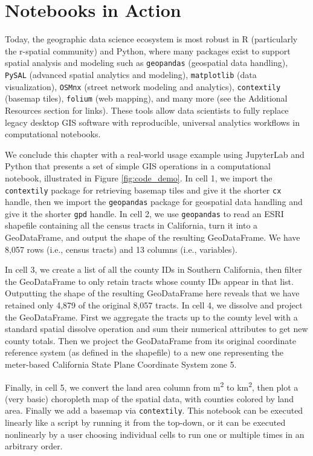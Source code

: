 \documentclass[11pt,letterpaper]{article}
\begin{document}
\section{Notebooks in Action}

Today, the geographic data science ecosystem is most robust in R (particularly the r-spatial community) and Python, where many packages exist to support spatial analysis and modeling such as \texttt{geopandas} (geospatial data handling), \texttt{PySAL} (advanced spatial analytics and modeling), \texttt{matplotlib} (data visualization), \texttt{OSMnx}  (street network modeling and analytics), \texttt{contextily} (basemap tiles), \texttt{folium} (web mapping), and many more (see the Additional Resources section for links). These tools allow data scientists to fully replace legacy desktop GIS software with reproducible, universal analytics workflows in computational notebooks.

We conclude this chapter with a real-world usage example using JupyterLab and Python that presents a set of simple GIS operations in a computational notebook, illustrated in Figure \ref{fig:code_demo}. In cell 1, we import the \texttt{contextily} package for retrieving basemap tiles and give it the shorter \texttt{cx} handle, then we import the \texttt{geopandas} package for geospatial data handling and give it the shorter \texttt{gpd} handle. In cell 2, we use \texttt{geopandas} to read an ESRI shapefile containing all the census tracts in California, turn it into a GeoDataFrame, and output the shape of the resulting GeoDataFrame. We have 8,057 rows (i.e., census tracts) and 13 columns (i.e., variables).

In cell 3, we create a list of all the county IDs in Southern California, then filter the GeoDataFrame to only retain tracts whose county IDs appear in that list. Outputting the shape of the resulting GeoDataFrame here reveals that we have retained only 4,879 of the original 8,057 tracts. In cell 4, we dissolve and project the GeoDataFrame. First we aggregate the tracts up to the county level with a standard spatial dissolve operation and sum their numerical attributes to get new county totals. Then we project the GeoDataFrame from its original coordinate reference system (as defined in the shapefile) to a new one representing the meter-based California State Plane Coordinate System zone 5.

Finally, in cell 5, we convert the land area column from m\textsuperscript{2} to km\textsuperscript{2}, then plot a (very basic) choropleth map of the spatial data, with counties colored by land area. Finally we add a basemap via \texttt{contextily}. This notebook can be executed linearly like a script by running it from the top-down, or it can be executed nonlinearly by a user choosing individual cells to run one or multiple times in an arbitrary order.
\end{document}

